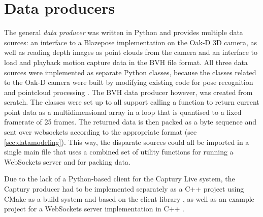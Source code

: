 \section{Data producers}

The general \emph{data producer} was written in Python and provides multiple data sources: an interface to a Blazepose implementation on the Oak-D \ac{3D} camera, as well as reading depth images as point clouds from the camera and an interface to load and playback motion capture data in the \ac{BVH} file format.
All three data sources were implemented as separate Python classes, because the classes related to the Oak-D camera were built by modifying existing code for pose recognition \parencite{githubDepthAiBlazePose} and pointcloud processing \parencite{githubDepthAiPointcloud}.
The \ac{BVH} data producer however, was created from scratch.
The classes were set up to all support calling a function to return current point data as a multidimensional array in a loop that is quantised to a fixed framerate of 25 frames.
The returned data is then packed as a byte sequence and sent over websockets according to the appropriate format (see \autoref{sec:datamodeling}).
This way, the disparate sources could all be imported in a single main file that uses a combined set of utility functions for running a WebSockets server and for packing data.

Due to the lack of a Python-based client for the Captury Live system, the Captury producer had to be implemented separately as a C++ project using CMake as a build system and based on the  client library \parencite{githubRemoteCaptury}, as well as an example project for a WebSockets server implementation in C++ \parencite{githubCppWebSocketsDemo}.

